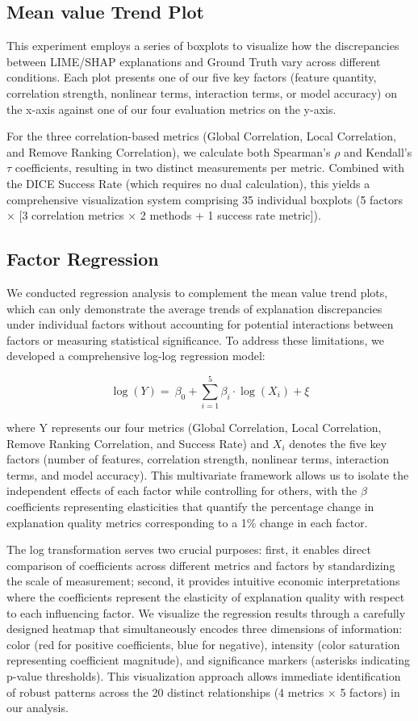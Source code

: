 \documentclass{article}
\begin{document}
\subsection{Mean value Trend Plot}

This experiment employs a series of boxplots to visualize how the discrepancies between LIME/SHAP explanations and Ground Truth vary across different conditions. Each plot presents one of our five key factors (feature quantity, correlation strength, nonlinear terms, interaction terms, or model accuracy) on the x-axis against one of our four evaluation metrics on the y-axis.

For the three correlation-based metrics (Global Correlation, Local Correlation, and Remove Ranking Correlation), we calculate both Spearman's $\rho$ and Kendall's $\tau$ coefficients, resulting in two distinct measurements per metric. Combined with the DICE Success Rate (which requires no dual calculation), this yields a comprehensive visualization system comprising 35 individual boxplots (5 factors × [3 correlation metrics × 2 methods + 1 success rate metric]).

\subsection{Factor Regression}

We conducted regression analysis to complement the mean value trend plots, which can only demonstrate the average trends of explanation discrepancies under individual factors without accounting for potential interactions between factors or measuring statistical significance. To address these limitations, we developed a comprehensive log-log regression model:

$$\log(Y) = \ \beta_{0} + \sum_{i = 1}^{5}{\beta_{i} \cdot \log\left( X_{i} \right)} + \xi$$

where Y represents our four metrics (Global Correlation, Local Correlation, Remove Ranking Correlation, and Success Rate) and $X_i$ denotes the five key factors (number of features, correlation strength, nonlinear terms, interaction terms, and model accuracy). This multivariate framework allows us to isolate the independent effects of each factor while controlling for others, with the $\beta$ coefficients representing elasticities that quantify the percentage change in explanation quality metrics corresponding to a 1\% change in each factor.

The log transformation serves two crucial purposes: first, it enables direct comparison of coefficients across different metrics and factors by standardizing the scale of measurement; second, it provides intuitive economic interpretations where the coefficients represent the elasticity of explanation quality with respect to each influencing factor. We visualize the regression results through a carefully designed heatmap that simultaneously encodes three dimensions of information: color (red for positive coefficients, blue for negative), intensity (color saturation representing coefficient magnitude), and significance markers (asterisks indicating p-value thresholds). This visualization approach allows immediate identification of robust patterns across the 20 distinct relationships (4 metrics × 5 factors) in our analysis.
\end{document}
